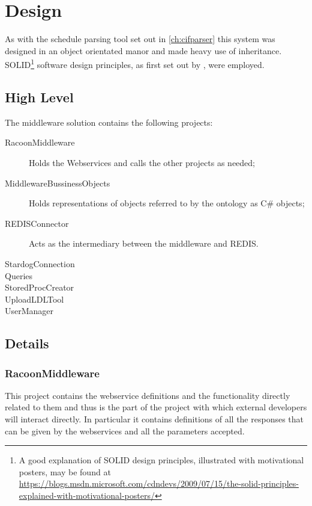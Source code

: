 \section{Design}
As with the schedule parsing tool set out in \autoref{ch:cifparser} this system was designed in an object orientated manor and made heavy use of inheritance. SOLID\footnote{A good explanation of SOLID design principles, illustrated with motivational posters, may be found at \url{https://blogs.msdn.microsoft.com/cdndevs/2009/07/15/the-solid-principles-explained-with-motivational-posters/}} software design principles, as first set out by \citet{Martin2003}, were employed. 
\subsection{High Level}
The middleware solution contains the following projects:

\begin{description}
    \item[RacoonMiddleware] Holds the Webservices and calls the other projects as needed;
    \item[MiddlewareBussinessObjects] Holds representations of objects referred to by the ontology as C\# objects;     
    \item[REDISConnector] Acts as the intermediary between the middleware and REDIS.
    \item[StardogConnection]
    \item[Queries]   
    \item[StoredProcCreator]
    \item[UploadLDLTool]
    \item[UserManager]
\end{description}

\subsection{Details}
\subsubsection{RacoonMiddleware}
This project contains the webservice definitions and the functionality directly related to them and thus is the part of the project with which external developers will interact directly. In particular it contains definitions of all the responses that can be given by the webservices and all the parameters accepted.


